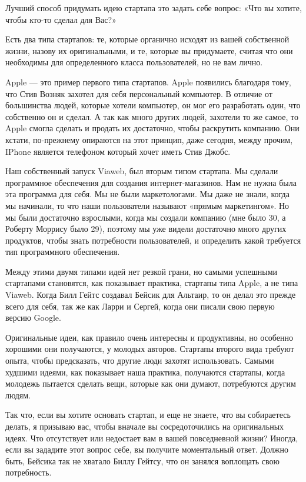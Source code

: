 \documentclass[ebook,12pt,oneside,openany]{memoir}
\begin{document}
\maketitle

Лучший способ придумать идею стартапа это задать себе вопрос: «Что вы
хотите, чтобы кто-то сделал для Вас?»

Есть два типа стартапов: те, которые органично исходят из вашей
собственной жизни, назову их оригинальными, и те, которые вы
придумаете, считая что они необходимы для определенного класса
пользователей, но не вам лично.

Apple — это пример первого типа стартапов. Apple появились благодаря
тому, что Стив Возняк захотел для себя персональный компьютер. В
отличие от большинства людей, которые хотели компьютер, он мог его
разработать один, что собственно он и сделал. А так как много других
людей, захотели то же самое, то Apple смогла сделать и продать их
достаточно, чтобы раскрутить компанию. Они кстати, по-прежнему
опираются на этот принцип, даже сегодня, между прочим, IPhone является
телефоном который хочет иметь Стив Джобс.

Наш собственный запуск Viaweb, был вторым типом стартапа. Мы сделали
программное обеспечения для создания интернет-магазинов. Нам не нужна
была эта программа для себя. Мы не были маркетологами. Мы даже не
знали, когда мы начинали, то что наши пользователи называют «прямым
маркетингом». Но мы были достаточно взрослыми, когда мы создали
компанию (мне было 30, а Роберту Моррису было 29), поэтому мы уже
видели достаточно много других продуктов, чтобы знать потребности
пользователей, и определить какой требуется тип программного
обеспечения.

Между этими двумя типами идей нет резкой грани, но самыми успешными
стартапами становятся, как показывает практика, стартапы типа Apple, а
не типа Viaweb. Когда Билл Гейтс создавал Бейсик для Альтаир, то он
делал это прежде всего для себя, так же как Ларри и Сергей, когда они
писали свою первую версию Google.

Оригинальные идеи, как правило очень интересны и продуктивны, но
особенно хорошими они получаются, у молодых авторов. Стартапы второго
вида требуют опыта, чтобы предсказать, что другие люди захотят
использовать. Самыми худшими идеями, как показывает наша практика,
получаются стартапы, когда молодежь пытается сделать вещи, которые как
они думают, потребуются другим людям.

Так что, если вы хотите основать стартап, и еще не знаете, что вы
собираетесь делать, я призываю вас, чтобы вначале вы сосредоточились
на оригинальных идеях. Что отсутствует или недостает вам в вашей
повседневной жизни? Иногда, если вы зададите этот вопрос себе, вы
получите моментальный ответ. Должно быть, Бейсика так не хватало Биллу
Гейтсу, что он занялся воплощать свою потребность.
\end{document}
